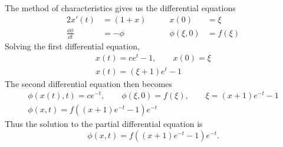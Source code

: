 \begin{Solution}
  The method of characteristics gives us the differential equations
  \begin{alignat*}{2}
    x'(t) &= (1+x) &\qquad x(0) &= \xi \\
    \frac{\dd \phi}{\dd t} &= -\phi &\qquad \phi(\xi,0) &= f(\xi)
  \end{alignat*}
  Solving the first differential equation,
  \begin{gather*}
    x(t) = c e^{t} - 1, \qquad x(0) = \xi \\
    x(t) = (\xi+1)e^{t} - 1
  \end{gather*}
  The second differential equation then becomes
  \begin{gather*}
    \phi(x(t),t) = c e^{-t}, \qquad \phi(\xi,0) = f(\xi), \qquad
    \xi = (x+1)e^{-t} - 1 \\
    \phi(x,t) = f((x+1)e^{-t} - 1) e^{-t}
  \end{gather*}
  Thus the solution to the partial differential equation is
  \[ 
  \boxed{ 
    \phi(x,t) = f((x+1)e^{-t} - 1) e^{-t}. 
    } 
  \]
\end{Solution}



